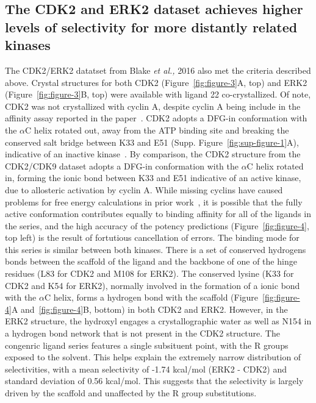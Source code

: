 \documentclass[phd,tocprelim]{cornell}
\begin{document}
\subsection{The CDK2 and ERK2 dataset achieves higher levels of selectivity for more distantly related kinases}
The CDK2/ERK2 datatset from Blake \emph{et al.,} 2016 also met the criteria described above. Crystal structures for both CDK2 (Figure~\ref{fig:figure-3}A, top) and ERK2 (Figure~\ref{fig:figure-3}B, top) were available with ligand 22 co-crystallized. Of note, CDK2 was not crystallized with cyclin A, despite cyclin A being include in the affinity assay reported in the paper~\citep{Blake2016-su}. CDK2 adopts a DFG-in conformation with the $\alpha$C helix rotated out, away from the ATP binding site and breaking the conserved salt bridge between K33 and E51 (Supp. Figure~\ref{fig:sup-figure-1}A), indicative of an inactive kinase~\citep{Huse2002-ml,Hari:2013dp}. By comparison, the CDK2 structure from the CDK2/CDK9 dataset adopts a DFG-in conformation with the $\alpha$C helix rotated in, forming the ionic bond between K33 and E51 indicative of an active kinase, due to allosteric activation by cyclin A. While missing cyclins have caused problems for free energy calculations in prior work~, it is possible that the fully active conformation contributes equally to binding affinity for all of the ligands in the series, and the high accuracy of the potency predictions (Figure~\ref{fig:figure-4}, top left) is the result of fortutious cancellation of errors. The binding mode for this series is similar between both kinases. There is a set of conserved hydrogens bonds between the scaffold of the ligand and the backbone of one of the hinge residues (L83 for CDK2 and M108 for ERK2). The conserved lysine (K33 for CDK2 and K54 for ERK2), normally involved in the formation of a ionic bond with the $\alpha$C helix, forms a hydrogen bond with the scaffold (Figure~\ref{fig:figure-4}A and~\ref{fig:figure-4}B, bottom) in both CDK2 and ERK2. However, in the ERK2 structure, the hydroxyl engages a crystallographic water as well as N154 in a hydrogen bond network that is not present in the CDK2 structure. 
The congenric ligand series features a single subsituent point, with the R groups exposed to the solvent. This helps explain the extremely narrow distribution of selectivities, with a mean selectivity of -1.74 kcal/mol (ERK2 - CDK2) and standard deviation of 0.56 kcal/mol. This suggests that the selectivity is largely driven by the scaffold and unaffected by the R group substitutions.
\end{document}
